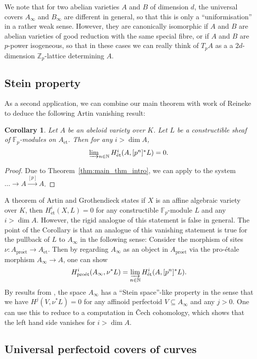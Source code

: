 \documentclass[10pt,oneside]{amsart}
\newtheorem{corollary}[theorem]{Corollary}
\theoremstyle{definition}
\newcommand{\et}{\operatorname{\acute{e}t}}
\newcommand{\proet}{\operatorname{pro\acute{e}t}}
\newcommand{\N}{\mathbb{N}}
\begin{document}
	We note that for two abelian varieties $A$ and $B$ of dimension $d$, the universal covers $A_\infty$ and $B_\infty$ are different in general, so that this is only a ``uniformisation'' in a rather weak sense. However, they are canonically isomorphic if $A$ and $B$ are abelian varieties of good reduction with the same special fibre, or if $A$ and $B$ are $p$-power isogeneous, so that in these cases we can really think of $T_pA$ as a a $2d$-dimension $\mathbb Z_p$-lattice determining $A$.
	\subsection{Stein property}
	As a second application, we can combine our main theorem with work of Reineke to deduce the following Artin vanishing result:
	\begin{corollary}
		Let $A$ be an abeloid variety over $K$. Let $L$ be a constructible sheaf of $\mathbb F_p$-modules on $A_{\et}$. Then for any $i>\dim A$,
		\[\textstyle\varinjlim_{n\in \mathbb N}H_{\et}^i(A,[p^n]^{\ast}L)=0.\]
	\end{corollary}
	\begin{proof}
	Due to Theorem~\ref{thm:main_thm_intro}, we can apply \cite[Theorem 3.3]{Reineke} to the system $\dots \rightarrow A\xrightarrow{[p]}A$.
	\end{proof}
	A theorem of Artin and Grothendieck states if $X$ is an affine algebraic variety over $K$, then $H_{\et}^i(X,L)=0$ for any constructible $\mathbb F_p$-module $L$ and any $i>\dim A$. However, the rigid analogue of this statement is false in general. The point of the Corollary is that an analogue of this vanishing statement is true for the pullback of $L$ to $A_\infty$ in the following sense: Consider the morphism of sites $\nu\colon A_{\proet}\to A_{\et}$. Then by regarding $A_\infty$ as an object in $A_{\proet}$ via the pro-\'etale morphism $A_\infty\to A$, one can show
	\[H^i_{\proet}(A_\infty,\nu^{\ast}L)=\varinjlim_{n\in\N} H^i_{\et}(A,[p^n]^{\ast}L). \]
	By results from \cite{p-adic_Hodge}, the space $A_\infty$ has a ``Stein space''-like property in the sense that we have $H^j(V,\nu^{\ast}L)=0$ for any affinoid perfectoid $V\subseteq A_\infty$ and any $j>0$. One can use this to reduce to a computation in \v{C}ech cohomology, which shows that the left hand side vanishes for $i>\dim A$.
	\subsection{Universal perfectoid covers of curves}
	
\end{document}
